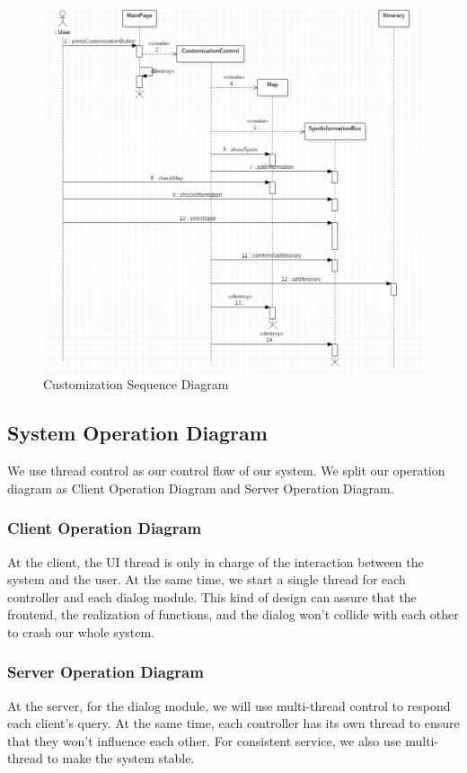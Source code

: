 \documentclass[10pt]{article}
\begin{document}
\begin{figure}[H]
    \centering
    
    \includegraphics[width=14cm]{customization.png}
    \caption{Customization Sequence Diagram}
    \label{Customization Sequence Diagram}
\end{figure}

\subsection{System Operation Diagram}
We use thread control as our control flow of our system. We split our operation diagram as Client Operation Diagram and Server Operation Diagram.

\subsubsection{Client Operation Diagram}
At the client, the UI thread is only in charge of the interaction between the system and the user. At the same time, we start a single thread for each controller and each dialog module. This kind of design can assure that the frontend, the realization of functions, and the dialog won’t collide with each other to crash our whole system.

\subsubsection{Server Operation Diagram}
At the server, for the dialog module, we will use multi-thread control to respond each client’s query. At the same time, each controller has its own thread to ensure that they won’t influence each other. For consistent service, we also use multi-thread to make the system stable.
\end{document}
